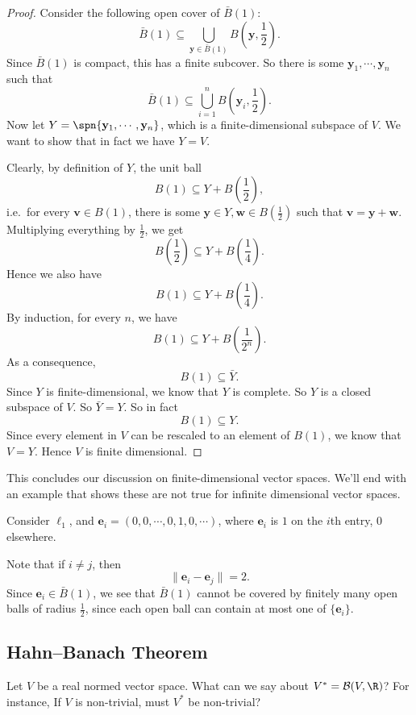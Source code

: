 \documentclass[a4paper]{article}
\begin{document}
\begin{proof}
  Consider the following open cover of $\bar{B}(1)$:
  \[
    \bar{B}(1) \subseteq \bigcup_{\mathbf{y}\in \bar{B}(1)} B\left(\mathbf{y}, \frac{1}{2}\right).
  \]
  Since $\bar{B}(1)$ is compact, this has a finite subcover. So there is some $\mathbf{y}_1, \cdots, \mathbf{y}_n$ such that
  \[
    \bar{B}(1) \subseteq \bigcup_{i = 1}^n B\left(\mathbf{y}_i, \frac{1}{2}\right).
  \]
  Now let $Y = \spn\{\mathbf{y}_1, \cdots, \mathbf{y}_n\}$, which is a finite-dimensional subspace of $V$. We want to show that in fact we have $Y = V$.

  Clearly, by definition of $Y$, the unit ball
  \[
    B(1) \subseteq Y + B\left(\frac{1}{2}\right),
  \]
  i.e.\ for every $\mathbf{v}\in B(1)$, there is some $\mathbf{y}\in Y, \mathbf{w} \in B(\frac{1}{2})$ such that $\mathbf{v} = \mathbf{y} + \mathbf{w}$. Multiplying everything by $\frac{1}{2}$, we get
  \[
    B\left(\frac{1}{2}\right) \subseteq Y + B\left(\frac{1}{4}\right).
  \]
  Hence we also have
  \[
    B(1) \subseteq Y + B\left(\frac{1}{4}\right).
  \]
  By induction, for every $n$, we have
  \[
    B(1) \subseteq Y + B\left(\frac{1}{2^n}\right).
  \]
  As a consequence,
  \[
    B(1) \subseteq \bar{Y}.
  \]
  Since $Y$ is finite-dimensional, we know that $Y$ is complete. So $Y$ is a closed subspace of $V$. So $\bar{Y} = Y$. So in fact
  \[
    B(1) \subseteq Y.
  \]
  Since every element in $V$ can be rescaled to an element of $B(1)$, we know that $V = Y$. Hence $V$ is finite dimensional.
\end{proof}
This concludes our discussion on finite-dimensional vector spaces. We'll end with an example that shows these are not true for infinite dimensional vector spaces.
\begin{eg}
  Consider $\ell_1$, and $\mathbf{e}_i = (0, 0, \cdots, 0, 1, 0, \cdots)$, where $\mathbf{e}_i$ is $1$ on the $i$th entry, $0$ elsewhere.

  Note that if $i \not= j$, then
  \[
    \|\mathbf{e}_i - \mathbf{e}_j\| = 2.
  \]
  Since $\mathbf{e}_i \in \bar{B}(1)$, we see that $\bar{B}(1)$ cannot be covered by finitely many open balls of radius $\frac{1}{2}$, since each open ball can contain at most one of $\{\mathbf{e}_i\}$.
\end{eg}

\subsection{Hahn--Banach Theorem}
Let $V$ be a real normed vector space. What can we say about $V^* = \mathcal{B}(V, \R)$? For instance, If $V$ is non-trivial, must $V^*$ be non-trivial?
\end{document}
